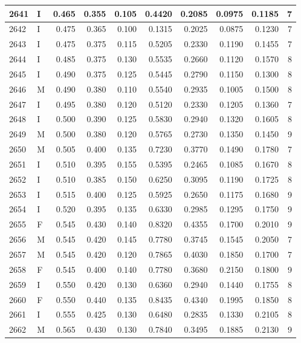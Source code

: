 \documentclass[9pt,twocolumn,twoside,]{pnas-new}
\begin{document}
\begin{tabular}{l|l|r|r|r|r|r|r|r|r}
\hline
2641 & I & 0.465 & 0.355 & 0.105 & 0.4420 & 0.2085 & 0.0975 & 0.1185 & 7\\
\hline
2642 & I & 0.475 & 0.365 & 0.100 & 0.1315 & 0.2025 & 0.0875 & 0.1230 & 7\\
\hline
2643 & I & 0.475 & 0.375 & 0.115 & 0.5205 & 0.2330 & 0.1190 & 0.1455 & 7\\
\hline
2644 & I & 0.485 & 0.375 & 0.130 & 0.5535 & 0.2660 & 0.1120 & 0.1570 & 8\\
\hline
2645 & I & 0.490 & 0.375 & 0.125 & 0.5445 & 0.2790 & 0.1150 & 0.1300 & 8\\
\hline
2646 & M & 0.490 & 0.380 & 0.110 & 0.5540 & 0.2935 & 0.1005 & 0.1500 & 8\\
\hline
2647 & I & 0.495 & 0.380 & 0.120 & 0.5120 & 0.2330 & 0.1205 & 0.1360 & 7\\
\hline
2648 & I & 0.500 & 0.390 & 0.125 & 0.5830 & 0.2940 & 0.1320 & 0.1605 & 8\\
\hline
2649 & M & 0.500 & 0.380 & 0.120 & 0.5765 & 0.2730 & 0.1350 & 0.1450 & 9\\
\hline
2650 & M & 0.505 & 0.400 & 0.135 & 0.7230 & 0.3770 & 0.1490 & 0.1780 & 7\\
\hline
2651 & I & 0.510 & 0.395 & 0.155 & 0.5395 & 0.2465 & 0.1085 & 0.1670 & 8\\
\hline
2652 & I & 0.510 & 0.385 & 0.150 & 0.6250 & 0.3095 & 0.1190 & 0.1725 & 8\\
\hline
2653 & I & 0.515 & 0.400 & 0.125 & 0.5925 & 0.2650 & 0.1175 & 0.1680 & 9\\
\hline
2654 & I & 0.520 & 0.395 & 0.135 & 0.6330 & 0.2985 & 0.1295 & 0.1750 & 9\\
\hline
2655 & F & 0.545 & 0.430 & 0.140 & 0.8320 & 0.4355 & 0.1700 & 0.2010 & 9\\
\hline
2656 & M & 0.545 & 0.420 & 0.145 & 0.7780 & 0.3745 & 0.1545 & 0.2050 & 7\\
\hline
2657 & M & 0.545 & 0.420 & 0.120 & 0.7865 & 0.4030 & 0.1850 & 0.1700 & 7\\
\hline
2658 & F & 0.545 & 0.400 & 0.140 & 0.7780 & 0.3680 & 0.2150 & 0.1800 & 9\\
\hline
2659 & I & 0.550 & 0.420 & 0.130 & 0.6360 & 0.2940 & 0.1440 & 0.1755 & 8\\
\hline
2660 & F & 0.550 & 0.440 & 0.135 & 0.8435 & 0.4340 & 0.1995 & 0.1850 & 8\\
\hline
2661 & I & 0.555 & 0.425 & 0.130 & 0.6480 & 0.2835 & 0.1330 & 0.2105 & 8\\
\hline
2662 & M & 0.565 & 0.430 & 0.130 & 0.7840 & 0.3495 & 0.1885 & 0.2130 & 9\\

\end{tabular}
\end{document}
